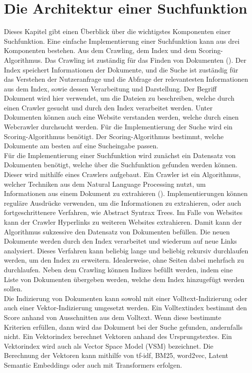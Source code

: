 \section{Die Architektur einer Suchfunktion}
Dieses Kapitel gibt einen Überblick über die wichtigstes Komponenten einer Suchfunktion.
Eine einfache Implementierung einer Suchfunktion kann aus drei Komponenten bestehen.
Aus dem Crawling, dem Index und dem Scoring-Algorithmus.
Das Crawling ist zuständig für das Finden von Dokumenten (\cite{Castillo_2005}).
Der Index speichert Informationen der Dokumente, und die Suche ist zuständig für das Verstehen der Nutzeranfrage und die Abfrage der relevantesten Informationen aus dem Index, sowie dessen Verarbeitung und Darstellung.
Der Begriff Dokument wird hier verwendet, um die Dateien zu beschreiben, welche durch einen Crawler gesucht und durch den Index verarbeitet werden.
Unter Dokumenten können auch eine Website verstanden werden, welche durch einen Webcrawler durchsucht werden.
Für die Implementierung der Suche wird ein Scoring-Algorithmus benötigt.
Der Scoring-Algorithmus bestimmt, welche Dokumente am besten auf eine Sucheingabe passen.\\

Für die Implementierung einer Suchfunktion wird zunächst ein Datensatz von Dokumenten benötigt, welche über die Suchfunktion gefunden werden können.
Dieser wird mithilfe eines Crawlers aufgebaut.
Ein Crawler ist ein Algorithmus, welcher Techniken aus dem Natural Language Processing nutzt, um Informationen aus einem Dokument zu extrahieren (\cite{Khder_2021}).
Implementierungen können reguläre Ausdrücke verwenden, um die Informationen zu extrahieren, oder auch fortgeschrittenere Verfahren, wie Abstract Syntrax Trees.
Im Falle von Websites kann der Crawler Hyperlinks zu weiteren Websites extrahieren.
Damit kann der Algorithmus sukzessive den Datensatz von Dokumenten befüllen.
Die neuen Dokumente werden durch den Index verarbeitet und wiederum auf neue Links analysiert.
Dieses Verfahren kann beliebig lange und beliebig rekursiv durchlaufen werden, um den Index zu erweitern.
Idealerweise, ohne Seiten dabei mehrfach zu durchlaufen.
Neben dem Crawling können Indizes befüllt werden, indem eine Liste von Dokumenten übergeben werden, welche dem Index hinzugefügt werden sollen.\\

Die Indizierung von Dokumenten kann sowohl mit einer Volltext-Indizierung oder auch einer Vektor-Indizierung umgesetzt werden.
Ein Volltextindex bestimmt den Score anhand von Ausschnitten aus dem Volltext.
Wenn diese bestimmte Kriterien erfüllen, dann wird das Dokument bei der Suche gefunden, andernfalls nicht.
Ein Vektorindex berechnet Vektoren anhand des Ursprungstextes.
Ein Vektorindex wird auch als Vector Space Model (VSM) bezeichnet.
Die Berechnung der Vektoren kann mithilfe von tf-idf, BM25, word2vec, Latent Semantic Embeddings oder auch mit Transformers erfolgen.

